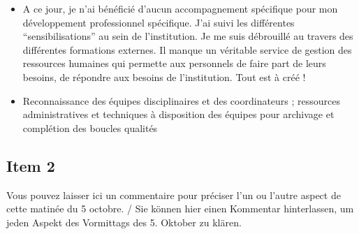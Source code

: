 \documentclass[
  french,
]{article}
\begin{document}
\begin{itemize}
\item
  A ce jour, je n'ai bénéficié d'aucun accompagnement spécifique pour mon développement professionnel spécifique. J'ai suivi les différentes ``sensibilisations'' au sein de l'institution. Je me suis débrouillé au travers des différentes formations externes. Il manque un véritable service de gestion des ressources humaines qui permette aux personnels de faire part de leurs besoins, de répondre aux besoins de l'institution. Tout est à créé !
\item
  Reconnaissance des équipes disciplinaires et des coordinateurs ; ressources administratives et techniques à disposition des équipes pour archivage et complétion des boucles qualités
\end{itemize}

\hypertarget{item-2}{%
\subsection{Item 2}\label{item-2}}

Vous pouvez laisser ici un commentaire pour préciser l'un ou l'autre aspect de cette matinée du 5 octobre. / Sie können hier einen Kommentar hinterlassen, um jeden Aspekt des Vormittags des 5. Oktober zu klären.
\end{document}
